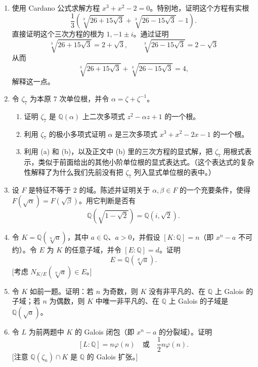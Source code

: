 \begin{enumerate}[label=\arabic*.]
\item 使用 Cardano 公式求解方程 $x^3+x^2-2=0$。特别地，证明这个方程有实根
\[
\frac13\left(\sqrt[3]{26+15\sqrt3}+\sqrt[3]{26-15\sqrt3}-1\right).
\]
直接证明这个三次方程的根为 $1,-1\pm i$。通过证明
\[
\sqrt[3]{26+15\sqrt3}=2+\sqrt3,
\qquad
\sqrt[3]{26-15\sqrt3}=2-\sqrt3
\]
从而
\[
\sqrt[3]{26+15\sqrt3}+\sqrt[3]{26-15\sqrt3}=4,
\]
解释这一点。

\item 令 $\zeta_7$ 为本原 $7$ 次单位根，并令 $\alpha=\zeta+\zeta^{-1}$。
\begin{enumerate}[label=(\alph*)]
\item 证明 $\zeta_7$ 是 $\mathbb Q(\alpha)$ 上二次多项式 $z^2-\alpha z+1$ 的一个根。
\item 利用 $\zeta_7$ 的极小多项式证明 $\alpha$ 是三次多项式 $x^3+x^2-2x-1$ 的一个根。
\item 利用 (a) 和 (b)，以及正文中 (b) 里的三次方程的显式解，把 $\zeta_7$ 用根式表示，类似于前面给出的其他小阶单位根的显式表达式。（这个表达式的复杂性解释了为什么我们先前没有把 $\zeta_7$ 列入显式单位根的表中。）
\end{enumerate}

\item 设 $F$ 是特征不等于 $2$ 的域。陈述并证明关于 $\alpha,\beta\in F$ 的一个充要条件，使得 $F(\sqrt\alpha)=F(\sqrt\beta)$。用它判断是否有
\[
\mathbb Q(\sqrt{1-\sqrt2})=\mathbb Q(i,\sqrt2).
\]

\item 令 $K=\mathbb Q(\sqrt[n]{a})$，其中 $a\in\mathbb Q$、$a>0$，并假设 $[K:\mathbb Q]=n$（即 $x^n-a$ 不可约）。令 $E$ 为 $K$ 的任意子域，并令 $[E:\mathbb Q]=d$。证明
\[
E=\mathbb Q(\sqrt[d]{a}).
\]
[考虑 $N_{K/E}(\sqrt[n]{a})\in E$。]

\item 令 $K$ 如前一题。证明：若 $n$ 为奇数，则 $K$ 没有非平凡的、在 $\mathbb Q$ 上 Galois 的子域；若 $n$ 为偶数，则 $K$ 中唯一非平凡的、在 $\mathbb Q$ 上 Galois 的子域是 $\mathbb Q(\sqrt a)$。

\item 令 $L$ 为前两题中 $K$ 的 Galois 闭包（即 $x^n-a$ 的分裂域）。证明
\[
[L:\mathbb Q]=n\varphi(n)
\quad\text{或}\quad
\frac12 n\varphi(n).
\]
[注意 $\mathbb Q(\zeta_n)\cap K$ 是 $\mathbb Q$ 的 Galois 扩张。]


\end{enumerate}
